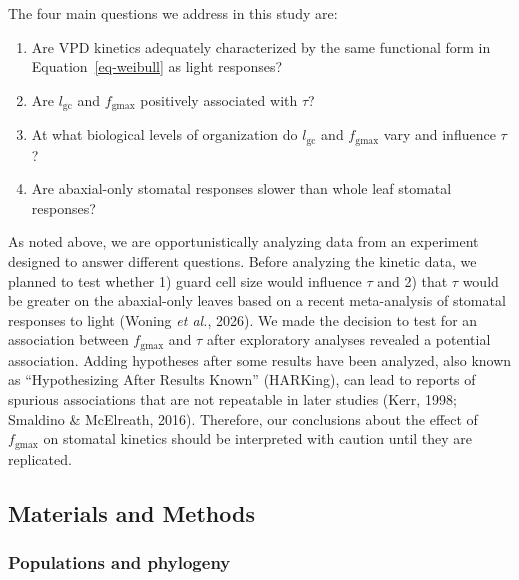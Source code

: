 \documentclass[
  letterpaper,
  DIV=11,
  numbers=noendperiod]{scrartcl}
\providecommand{\tightlist}{%
  \setlength{\itemsep}{0pt}\setlength{\parskip}{0pt}}\usepackage{longtable,booktabs,array}
\newcommand{\fgmax}{$f_\mathrm{gmax}$}
\newcommand{\gcl}{$l_\mathrm{gc}$}
\begin{document}
The four main questions we address in this study are:

\begin{enumerate}
\def\labelenumi{\arabic{enumi}.}
\tightlist
\item
  Are VPD kinetics adequately characterized by the same functional form
  in Equation~\ref{eq-weibull} as light responses?
\item
  Are \gcl{} and \fgmax{} positively associated with \(\tau\)?
\item
  At what biological levels of organization do \gcl{} and \fgmax{} vary
  and influence \(\tau\)?
\item
  Are abaxial-only stomatal responses slower than whole leaf stomatal
  responses?
\end{enumerate}

As noted above, we are opportunistically analyzing data from an
experiment designed to answer different questions. Before analyzing the
kinetic data, we planned to test whether 1) guard cell size would
influence \(\tau\) and 2) that \(\tau\) would be greater on the
abaxial-only leaves based on a recent meta-analysis of stomatal
responses to light (Woning \emph{et al.}, 2026). We made the decision to
test for an association between \fgmax{} and \(\tau\) after exploratory
analyses revealed a potential association. Adding hypotheses after some
results have been analyzed, also known as ``Hypothesizing After Results
Known'' (HARKing), can lead to reports of spurious associations that are
not repeatable in later studies (Kerr, 1998; Smaldino \& McElreath,
2016). Therefore, our conclusions about the effect of \fgmax{} on
stomatal kinetics should be interpreted with caution until they are
replicated.

\subsection{Materials and Methods}\label{sec-methods}

\subsubsection{Populations and
phylogeny}\label{populations-and-phylogeny}
\end{document}
